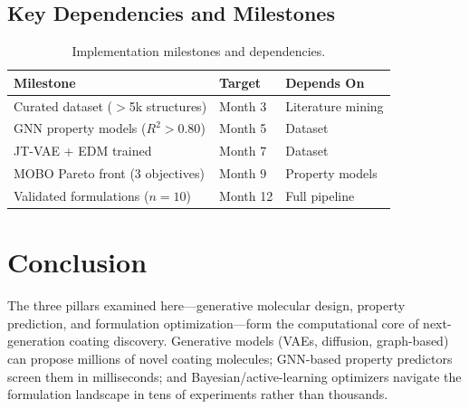 \documentclass[11pt,a4paper]{article}
\begin{document}
\subsection{Key Dependencies and Milestones}

\begin{table}[h]
\centering
\caption{Implementation milestones and dependencies.}
\label{tab:milestones}
\small
\begin{tabular}{@{}lll@{}}
\toprule
\textbf{Milestone} & \textbf{Target} & \textbf{Depends On} \\
\midrule
Curated dataset ($>$5k structures) & Month 3 & Literature mining \\
GNN property models ($R^2 > 0.80$) & Month 5 & Dataset \\
JT-VAE + EDM trained & Month 7 & Dataset \\
MOBO Pareto front (3 objectives) & Month 9 & Property models \\
Validated formulations ($n=10$) & Month 12 & Full pipeline \\
\bottomrule
\end{tabular}
\end{table}

\section{Conclusion}
\label{sec:conclusion}

The three pillars examined here---generative molecular design, property prediction, and formulation optimization---form the computational core of next-generation coating discovery.
Generative models (VAEs, diffusion, graph-based) can propose millions of novel coating molecules; GNN-based property predictors screen them in milliseconds; and Bayesian/active-learning optimizers navigate the formulation landscape in tens of experiments rather than thousands.
\end{document}
